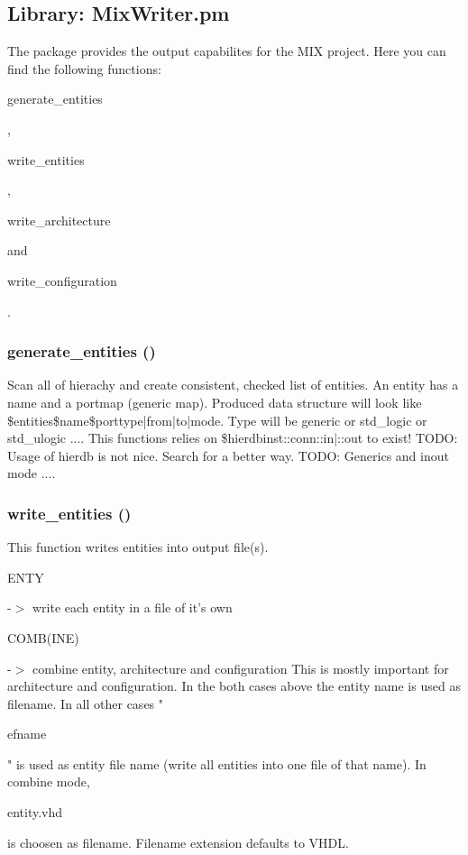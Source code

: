 \documentclass[a4paper,12pt]{article}
\begin{document}
\subsection{Library: MixWriter.pm}
The package provides the output capabilites for the MIX project. Here you can find the following functions: \begin{it}generate\_entities\end{it}, \begin{it}write\_entities\end{it}, \begin{it}write\_architecture\end{it} and \begin{it}write\_configuration\end{it}.\newline

\subsubsection{generate\_entities ()}
Scan all of hierachy and create consistent, checked list of entities. An entity has a name and a portmap (generic map). Produced data structure will look like \$entities{\$name}{\$port}{type|from|to|mode}. Type will be generic or std\_logic or std\_ulogic ....\newline
This functions relies on \$hierdb{inst}{::conn}{::in|::out} to exist!\newline
TODO: Usage of hierdb is not nice. Search for a better way.\newline
TODO: Generics and inout mode ....\newline

\subsubsection{write\_entities ()}
This function writes entities into output file(s).\newline
\hspace*{10mm}\begin{it}ENTY\end{it} -$>$ write each entity in a file of it's own\newline
\hspace*{10mm}\begin{it}COMB(INE)\end{it} -$>$ combine entity, architecture and configuration\newline
This is mostly important for architecture and configuration. In the both cases above the entity name is used as filename. In all other cases "\begin{it}efname\end{it}" is used as entity file name (write all entities into one file of that name). In combine mode, \begin{it}entity.vhd\end{it} is choosen as filename. Filename extension defaults to VHDL.
\end{document}
